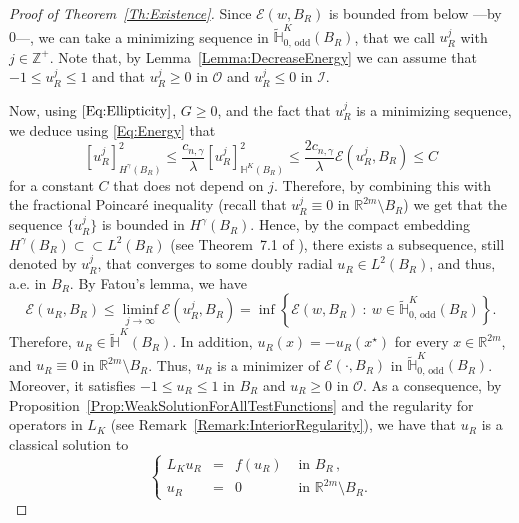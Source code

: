 \documentclass[12pt,reqno]{amsart}
\theoremstyle{definition}
\theoremstyle{remark}
\newcommand{\con}[1]{\mathbb{#1}}
\newcommand{\R}{\con{R}} %
\newcommand{\Z}{\con{Z}} %
\renewcommand{\H}{\con{H}}
\newcommand{\ecal}{\mathcal{E}}
\newcommand{\ical}{\mathcal{I}}
\newcommand{\ocal}{\mathcal{O}}
\newcommand{\s}{\gamma}
\newcommand{\setcond}[2]{\left \{ #1 \ : \ #2  \right \}}
\newcommand\beqc[1]{\left\{\begin{array}{#1}}
\newcommand\eeqc{\end{array} \right.}
\def\PDEsystem{rcll}
\numberwithin{equation}{section}
\begin{document}
	\begin{proof}[Proof of Theorem~\ref{Th:Existence}]
		Since $\ecal(w,B_R)$ is bounded from below ---by $0$---, we can take a minimizing sequence in $\widetilde{\H}^K_{0, \,\mathrm{odd}}(B_R)$, that we call $u_R^j$ with $j\in \Z^+$. Note that, by Lemma~\ref{Lemma:DecreaseEnergy} we can assume that $-1 \leq u_R^j \leq 1$ and that $u_R^j \geq 0$ in $\ocal$ and  $u_R^j \leq 0$ in $\ical$. 
		
		Now, using $\eqref{Eq:Ellipticity}$, $G\geq 0$, and the fact that $u_R^j$ is a minimizing sequence, we deduce using \eqref{Eq:Energy} that 
		$$
		[u_R^j]^2_{H^\s(B_R)} \leq \dfrac{c_{n,\s}}{\lambda}  [u_R^j]^2_{\H^K(B_R)}\leq \dfrac{2 c_{n,\s}}{\lambda}\ecal(u_R^j,B_R) \leq C
		$$
		for a constant $C$ that does not depend on $j$. Therefore, by combining this with the fractional Poincaré inequality (recall that $u_R^j \equiv 0$ in $\R^{2m}\setminus B_R$) we get that the sequence $\{u_R^j\}$ is bounded in $H^\s(B_R)$. Hence, by the compact embedding $H^\s(B_R) \subset \subset L^2(B_R)$ (see Theorem~7.1 of \cite{HitchhikerGuide}), there exists a subsequence, still denoted by $u_R^j$,  that converges to some doubly radial $u_R \in L^2(B_R)$, and thus, a.e. in $B_R$. By Fatou's lemma, we have
		$$
		\ecal(u_R, B_R)
		\leq \liminf_{j\to \infty} \ecal(u_R^j, B_R) = \inf \setcond{\ecal(w, B_R)}{w \in \widetilde{\H}^K_{0, \,\mathrm{odd}}(B_R)}.
		$$
		Therefore, $u_R \in \widetilde{\H}^K(B_R)$. In addition, $u_R(x) = - u_R(x^\star)$ for every $x\in \R^{2m}$, and $u_R \equiv 0 $ in $\R^{2m} \setminus B_R$. Thus, $u_R$ is a minimizer of $\ecal(\cdot, B_R)$ in $\widetilde{\H}^K_{0, \,\mathrm{odd}}(B_R)$. Moreover, it satisfies $-1\leq u_R \leq 1$ in $B_R$ and $u_R\geq 0$ in $\ocal$. As a consequence, by Proposition~\ref{Prop:WeakSolutionForAllTestFunctions} and the regularity for operators in $L_K$ (see Remark~\ref{Remark:InteriorRegularity}), we have that $u_R$ is a classical solution to
		$$
		\beqc{\PDEsystem}
		L_K  u_R &=& f(u_R) & \textrm{ in } B_R\,,\\
		u_R &=& 0 & \textrm{ in }\R^{2m} \setminus B_R.
		\eeqc
		$$	
		

\end{proof}
\end{document}
